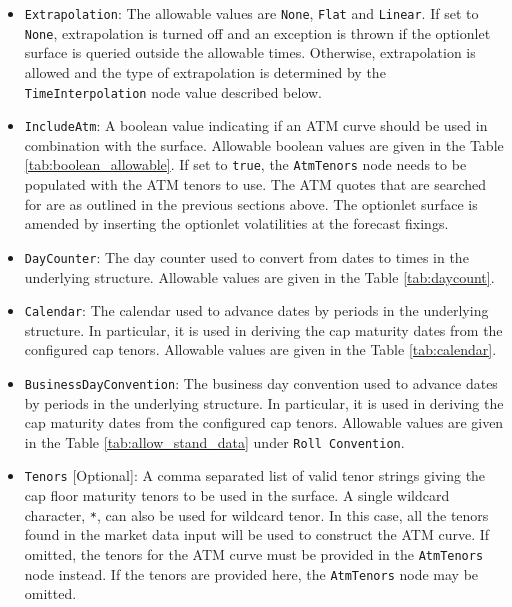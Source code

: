 \begin{itemize}
\item \lstinline!Extrapolation!:
The allowable values are \lstinline!None!, \lstinline!Flat! and \lstinline!Linear!. If set to \lstinline!None!, extrapolation is turned off and an exception is thrown if the optionlet surface is queried outside the allowable times. Otherwise, extrapolation is allowed and the type of extrapolation is determined by the \lstinline!TimeInterpolation! node value described below.

\item \lstinline!IncludeAtm!:
A boolean value indicating if an ATM curve should be used in combination with the surface. Allowable boolean values are given in the Table \ref{tab:boolean_allowable}. If set to \lstinline!true!, the \lstinline!AtmTenors! node needs to be populated with the ATM tenors to use. The ATM quotes that are searched for are as outlined in the previous sections above. The optionlet surface is amended by inserting the optionlet volatilities at the forecast fixings.

\item \lstinline!DayCounter!:
The day counter used to convert from dates to times in the underlying structure. Allowable values are given in the Table \ref{tab:daycount}.

\item \lstinline!Calendar!:
The calendar used to advance dates by periods in the underlying structure. In particular, it is used in deriving the cap maturity dates from the configured cap tenors. Allowable values are given in the Table \ref{tab:calendar}.

\item \lstinline!BusinessDayConvention!:
The business day convention used to advance dates by periods in the underlying structure. In particular, it is used in deriving the cap maturity dates from the configured cap tenors. Allowable values are given in the Table \ref{tab:allow_stand_data} under \lstinline!Roll Convention!.

\item \lstinline!Tenors! [Optional]:
A comma separated list of valid tenor strings giving the cap floor maturity tenors to be used in the surface. A single wildcard character, \lstinline!*!, can also be used for wildcard tenor. In this case, all the tenors found in the market data input will be used to construct the ATM curve. If omitted, the tenors for the ATM curve must be provided in the \lstinline!AtmTenors! node instead. If the tenors are provided here, the \lstinline!AtmTenors! node may be omitted.


\end{itemize}
